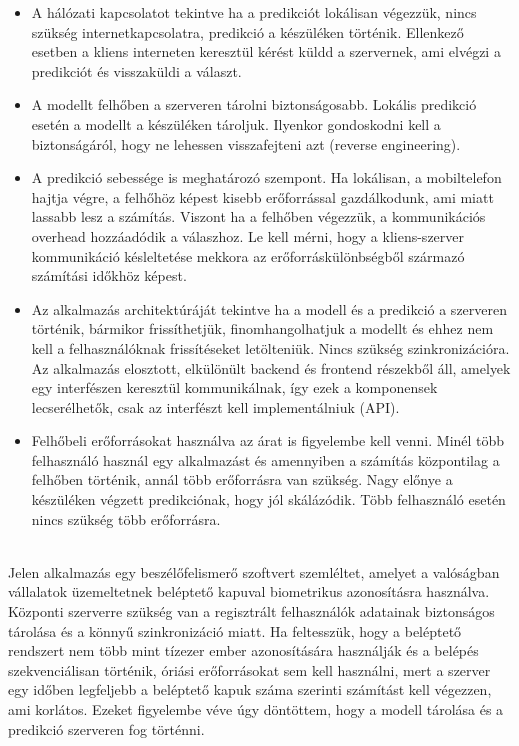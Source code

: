 \begin{itemize}
	\item A hálózati kapcsolatot tekintve ha a predikciót lokálisan végezzük, nincs szükség internetkapcsolatra, predikció a készüléken történik. Ellenkező esetben a kliens interneten keresztül kérést küldd a szervernek, ami elvégzi a predikciót és visszaküldi a választ.
	\item A modellt felhőben a szerveren tárolni biztonságosabb. Lokális predikció esetén a modellt a készüléken tároljuk. Ilyenkor gondoskodni kell a biztonságáról, hogy ne lehessen visszafejteni azt (reverse engineering).
	\item A predikció sebessége is meghatározó szempont. Ha lokálisan, a mobiltelefon hajtja végre, a felhőhöz képest kisebb erőforrással gazdálkodunk, ami miatt lassabb lesz a számítás. Viszont ha a felhőben végezzük, a kommunikációs overhead hozzáadódik a válaszhoz. Le kell mérni, hogy a kliens-szerver kommunikáció késleltetése mekkora az erőforráskülönbségből származó számítási időkhöz képest.
	\item Az alkalmazás architektúráját tekintve ha a modell és a predikció a szerveren történik, bármikor frissíthetjük, finomhangolhatjuk a modellt és ehhez nem kell a felhasználóknak frissítéseket letölteniük. Nincs szükség szinkronizációra. Az alkalmazás elosztott, elkülönült backend és frontend részekből áll, amelyek egy interfészen keresztül kommunikálnak, így ezek a komponensek lecserélhetők, csak az interfészt kell implementálniuk (API).
	\item Felhőbeli erőforrásokat használva az árat is figyelembe kell venni. Minél több felhasználó használ egy alkalmazást és amennyiben a számítás központilag a felhőben történik, annál több erőforrásra van szükség. Nagy előnye a készüléken végzett predikciónak, hogy jól skálázódik. Több felhasználó esetén nincs szükség több erőforrásra.
\end{itemize}
\ \\
Jelen alkalmazás egy beszélőfelismerő szoftvert szemléltet, amelyet a valóságban vállalatok üzemeltetnek beléptető kapuval biometrikus azonosításra használva. Központi szerverre szükség van a regisztrált felhasználók adatainak biztonságos tárolása és a könnyű szinkronizáció miatt. Ha feltesszük, hogy a beléptető rendszert nem több mint tízezer ember azonosítására használják és a belépés szekvenciálisan történik, óriási erőforrásokat sem kell használni, mert a szerver egy időben legfeljebb a beléptető kapuk száma szerinti számítást kell végezzen, ami korlátos. Ezeket figyelembe véve úgy döntöttem, hogy a modell tárolása és a predikció szerveren fog történni.

